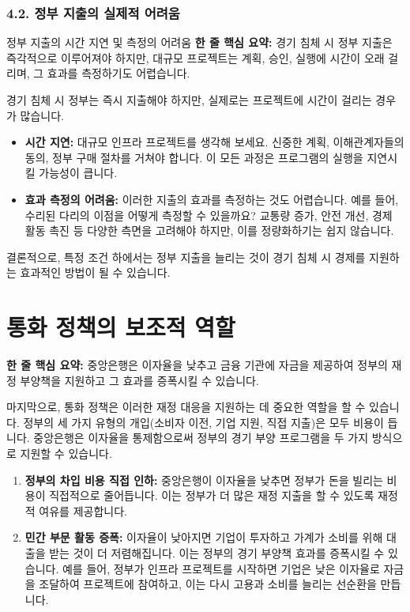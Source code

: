 \documentclass[11pt,a4paper]{book}
\theoremstyle{definition}
\begin{document}
\subsubsection*{4.2. 정부 지출의 실제적 어려움}

\begin{cautionbox}{정부 지출의 시간 지연 및 측정의 어려움}
    \textbf{한 줄 핵심 요약:} 경기 침체 시 정부 지출은 즉각적으로 이루어져야 하지만, 대규모 프로젝트는 계획, 승인, 실행에 시간이 오래 걸리며, 그 효과를 측정하기도 어렵습니다.
\end{cautionbox}

경기 침체 시 정부는 즉시 지출해야 하지만, 실제로는 프로젝트에 시간이 걸리는 경우가 많습니다.
\begin{itemize}
    \item \textbf{시간 지연:} 대규모 인프라 프로젝트를 생각해 보세요. 신중한 계획, 이해관계자들의 동의, 정부 구매 절차를 거쳐야 합니다. 이 모든 과정은 프로그램의 실행을 지연시킬 가능성이 큽니다.
    \item \textbf{효과 측정의 어려움:} 이러한 지출의 효과를 측정하는 것도 어렵습니다. 예를 들어, 수리된 다리의 이점을 어떻게 측정할 수 있을까요? 교통량 증가, 안전 개선, 경제 활동 촉진 등 다양한 측면을 고려해야 하지만, 이를 정량화하기는 쉽지 않습니다.
\end{itemize}

\begin{summarybox}[title={정부 지출의 결론}]
    결론적으로, 특정 조건 하에서는 정부 지출을 늘리는 것이 경기 침체 시 경제를 지원하는 효과적인 방법이 될 수 있습니다.
\end{summarybox}


\section{통화 정책의 보조적 역할}

\begin{tcolorbox}[mybox={재정 정책을 지원하는 통화 정책}]
    \textbf{한 줄 핵심 요약:} 중앙은행은 이자율을 낮추고 금융 기관에 자금을 제공하여 정부의 재정 부양책을 지원하고 그 효과를 증폭시킬 수 있습니다.
\end{tcolorbox}

마지막으로, 통화 정책은 이러한 재정 대응을 지원하는 데 중요한 역할을 할 수 있습니다. 정부의 세 가지 유형의 개입(소비자 이전, 기업 지원, 직접 지출)은 모두 비용이 듭니다. 중앙은행은 이자율을 통제함으로써 정부의 경기 부양 프로그램을 두 가지 방식으로 지원할 수 있습니다.

\begin{enumerate}
    \item \textbf{정부의 차입 비용 직접 인하:} 중앙은행이 이자율을 낮추면 정부가 돈을 빌리는 비용이 직접적으로 줄어듭니다. 이는 정부가 더 많은 재정 지출을 할 수 있도록 재정적 여유를 제공합니다.
    \item \textbf{민간 부문 활동 증폭:} 이자율이 낮아지면 기업이 투자하고 가계가 소비를 위해 대출을 받는 것이 더 저렴해집니다. 이는 정부의 경기 부양책 효과를 증폭시킬 수 있습니다. 예를 들어, 정부가 인프라 프로젝트를 시작하면 기업은 낮은 이자율로 자금을 조달하여 프로젝트에 참여하고, 이는 다시 고용과 소비를 늘리는 선순환을 만듭니다.
\end{enumerate}
\end{document}
